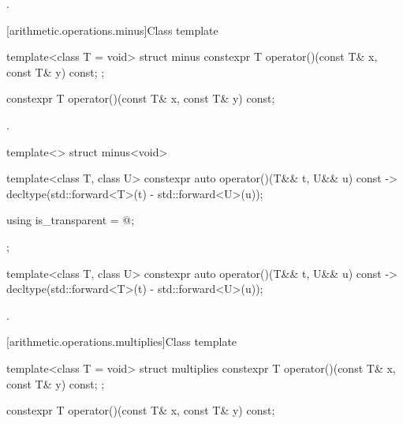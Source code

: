 \begin{itemdescr}
\pnum\returns {}.
\end{itemdescr}

[arithmetic.operations.minus]{Class template }

%
\begin{itemdecl}
template<class T = void> struct minus {
  constexpr T operator()(const T& x, const T& y) const;
};
\end{itemdecl}

%
\begin{itemdecl}
constexpr T operator()(const T& x, const T& y) const;
\end{itemdecl}

\begin{itemdescr}
\pnum\returns {}.
\end{itemdescr}

%
\begin{itemdecl}
template<> struct minus<void> {
  template<class T, class U> constexpr auto operator()(T&& t, U&& u) const
    -> decltype(std::forward<T>(t) - std::forward<U>(u));

  using is_transparent = @\unspec@;
};
\end{itemdecl}

%
\begin{itemdecl}
template<class T, class U> constexpr auto operator()(T&& t, U&& u) const
    -> decltype(std::forward<T>(t) - std::forward<U>(u));
\end{itemdecl}

\begin{itemdescr}
\pnum\returns {}.
\end{itemdescr}

[arithmetic.operations.multiplies]{Class template }

%
\begin{itemdecl}
template<class T = void> struct multiplies {
  constexpr T operator()(const T& x, const T& y) const;
};
\end{itemdecl}

%
\begin{itemdecl}
constexpr T operator()(const T& x, const T& y) const;
\end{itemdecl}

